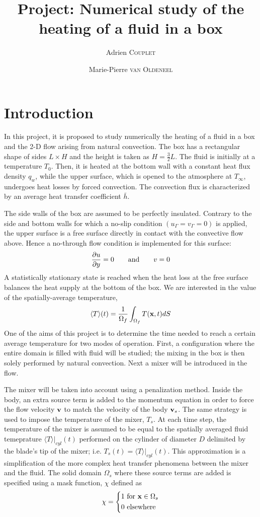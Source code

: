 \documentclass[a4paper,10pt]{scrartcl}
\title{Project: Numerical study of the heating of a fluid in a box}
\author{Adrien \textsc{Couplet} \and Marie-Pierre \textsc{van Oldeneel}}
\begin{document}
\maketitle
\section{Introduction}
In this project, it is proposed to study numerically the heating of a fluid in a box and the 2-D flow arising from natural convection. The box has a rectangular shape of sides $L\times H$ and the height is taken as $H=\frac{3}{2}L$. The fluid is initially at a temperature $T_0$. Then, it is heated at the bottom wall with a constant heat flux density $q_w$, while the upper surface, which is opened to the atmosphere at $T_\infty$, undergoes heat losses by forced convection. The convection flux is characterized by an average heat transfer coefficient $\bar{h}$.

The side walls of the box are assumed to be perfectly insulated. Contrary to the side and bottom walls for which a no-slip condition $(u_\Gamma = v_\Gamma=0)$ is applied, the upper surface is a free surface directly in contact with the convective flow above. Hence a no-through flow condition is implemented for this surface:
\begin{equation} \pdv{u}{y} = 0 \qquad\text{and}\qquad v=0 \end{equation}
A statistically stationary state is reached when the heat loss at the free surface balances the heat supply at the bottom of the box. We are interested in the value of the spatially-average temperature,
\begin{equation} \langle T\rangle(t) = \frac{1}{\Omega_f}\int_{\Omega_f}T(\vb{x},t)dS \end{equation}
One of the aims of this project is to determine the time needed to reach a certain average temperature for two modes of operation. First, a configuration where the entire domain is filled with fluid will be studied; the mixing in the box is then solely performed by natural convection. Next a mixer will be introduced in the flow.

The mixer will be taken into account using a penalization method. Inside the body, an extra source term is added to the momentum equation in order to force the flow velocity $\vb{v}$ to match the velocity of the body $\vb{v}_s$. The same strategy is used to impose the temperature of the mixer, $T_s$. At each time step, the temperature of the mixer is assumed to be equal to the spatially averaged fluid temeprature $\langle T\rangle\rvert_{cyl}(t)$ performed on the cylinder of diameter $D$ delimited by the blade's tip of the mixer; i.e. $T_s(t) = \langle T\rangle\rvert_{cyl}(t)$. This approximation is a simplification of the more complex heat transfer phenomena between the mixer and the fluid. The solid domain $\Omega_s$ where these source terms are added is specified using a mask function, $\chi$ defined as
\begin{equation} \chi = \left\{ \begin{aligned} 1 & \text{ for } \vb{x}\in\Omega_s \\ 0 & \text{ elsewhere}\end{aligned}\right. \end{equation}
\end{document}
